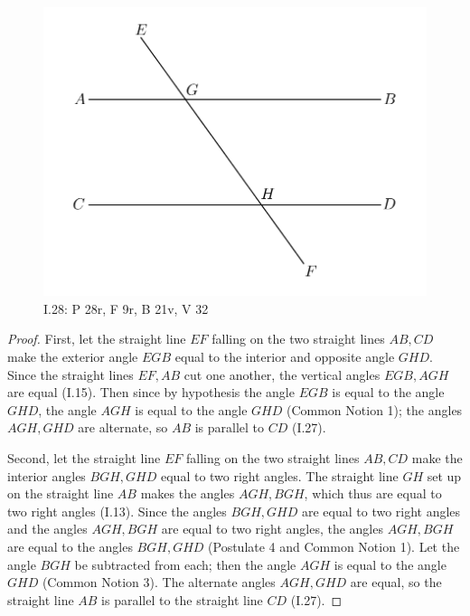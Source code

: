\documentclass{article}
\begin{document}
\begin{figure}
\begin{center}
\includegraphics{I28.png}
\end{center}
\caption{I.28: P 28r, F 9r, B 21v, V 32}
\label{I28}
\end{figure}

\begin{proof}
First, let the straight line $EF$ falling on the two straight lines $AB,CD$ make the exterior angle
$EGB$ equal to the interior and opposite angle $GHD$. 
Since the straight lines $EF,AB$ cut one another, the vertical angles $EGB,AGH$ are equal (I.15).
Then since by hypothesis the angle $EGB$ is equal to the angle $GHD$, the angle $AGH$ is 
equal to the angle $GHD$ (Common Notion 1);  the angles $AGH,GHD$ are alternate, so
$AB$ is parallel to $CD$ (I.27).

Second, let the straight line $EF$ falling on the two straight lines $AB,CD$ make the interior angles $BGH,GHD$
equal to two right angles. 
The straight line $GH$ set up on the straight line $AB$ makes the angles $AGH,BGH$, which thus are equal to
two right angles (I.13).
Since the angles $BGH,GHD$ are equal to two right angles and the angles $AGH,BGH$ are equal to two right angles,
the angles $AGH,BGH$ are equal to the angles $BGH,GHD$ (Postulate 4 and Common Notion 1).
Let the angle $BGH$ be subtracted from each;
then the angle $AGH$ is equal to the angle $GHD$ (Common Notion 3).
The alternate angles $AGH,GHD$ are equal, so the straight line $AB$ is parallel to the straight line $CD$ (I.27). 
\end{proof}
\end{document}
